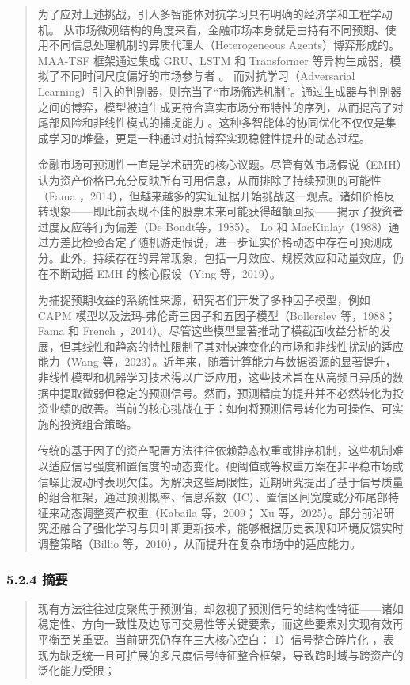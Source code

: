 \documentclass[UTF8]{ctexart}
\begin{document}
\begin{quote}
为了应对上述挑战，引入多智能体对抗学习具有明确的经济学和工程学动机。
从市场微观结构的角度来看，金融市场本身就是由持有不同预期、使用不同信息处理机制的异质代理人（Heterogeneous
Agents）博弈形成的。MAA-TSF 框架通过集成 GRU、LSTM 和 Transformer
等异构生成器，模拟了不同时间尺度偏好的市场参与者 。
而对抗学习（Adversarial
Learning）引入的判别器，则充当了``市场筛选机制''。通过生成器与判别器之间的博弈，模型被迫生成更符合真实市场分布特性的序列，从而提高了对尾部风险和非线性模式的捕捉能力
。这种多智能体的协同优化不仅仅是集成学习的堆叠，更是一种通过对抗博弈实现稳健性提升的动态过程。

金融市场可预测性一直是学术研究的核心议题。尽管有效市场假说（EMH）认为资产价格已充分反映所有可用信息，从而排除了持续预测的可能性（Fama
，2014），但越来越多的实证证据开始挑战这一观点。诸如价格反转现象------即此前表现不佳的股票未来可能获得超额回报------揭示了投资者过度反应等行为偏差（De
Bondt等，1985）。 Lo 和
MacKinlay（1988）通过方差比检验否定了随机游走假说，进一步证实价格动态中存在可预测成分。此外，持续存在的异常现象，包括一月效应、规模效应和动量效应，仍在不断动摇
EMH 的核心假设（Ying 等，2019）。

为捕捉预期收益的系统性来源，研究者们开发了多种因子模型，例如 CAPM
模型以及法玛-弗伦奇三因子和五因子模型（Bollerslev 等，1988； Fama 和
French
，2014）。尽管这些模型显著推动了横截面收益分析的发展，但其线性和静态的特性限制了其对快速变化的市场和非线性扰动的适应能力（Wang
等，2023）。近年来，随着计算能力与数据资源的显著提升，非线性模型和机器学习技术得以广泛应用，这些技术旨在从高频且异质的数据中提取微弱但稳定的预测信号。然而，预测精度的提升并不必然转化为投资业绩的改善。当前的核心挑战在于：如何将预测信号转化为可操作、可实施的投资组合策略。

传统的基于因子的资产配置方法往往依赖静态权重或排序机制，这些机制难以适应信号强度和置信度的动态变化。硬阈值或等权重方案在非平稳市场或信噪比波动时表现欠佳。为解决这些局限性，近期研究提出了基于信号质量的组合框架，通过预测概率、信息系数（IC）、置信区间宽度或分布尾部特征来动态调整资产权重（Kabaila
等，2009； Xu
等，2025）。部分前沿研究还融合了强化学习与贝叶斯更新技术，能够根据历史表现和环境反馈实时调整策略（Billio
等，2010），从而提升在复杂市场中的适应能力。
\end{quote}

\subsubsection{5.2.4 摘要}\label{ux6458ux8981}

\begin{quote}
现有方法往往过度聚焦于预测值，却忽视了预测信号的结构性特征------诸如稳定性、方向一致性及边际可交易性等关键要素，而这些要素对实现有效再平衡至关重要。当前研究仍存在三大核心空白：
1）信号整合碎片化
，表现为缺乏统一且可扩展的多尺度信号特征整合框架，导致跨时域与跨资产的泛化能力受限；
\end{quote}
\end{document}

